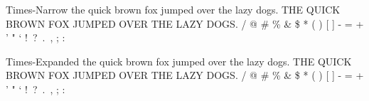 \documentclass{article}
\begin{document}
{{\selectfont
Times-Narrow \newline
the quick brown fox jumped over the lazy dogs. \newline
THE QUICK BROWN FOX JUMPED OVER THE LAZY DOGS.  / @ \# \% \& \$ * ( ) [ ] - = + ' " ` !\ ?\ .\ , ; : }\par
{\selectfont
Times-Expanded \newline
the quick brown fox jumped over the lazy dogs. \newline
THE QUICK BROWN FOX JUMPED OVER THE LAZY DOGS.  / @ \# \% \& \$ * ( ) [ ] - = + ' " ` !\ ?\ .\ , ; : }}\par
\newpage
\end{document}
